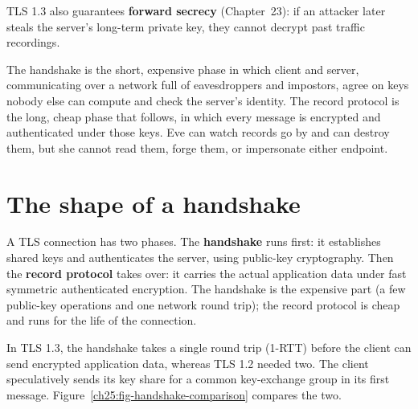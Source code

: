 TLS 1.3 also guarantees \textbf{forward secrecy} (Chapter~23): if an attacker
later steals the server's long-term private key, they cannot decrypt past
traffic recordings.

\begin{intuitionbox}
The handshake is the short, expensive phase in which client and server,
communicating over a network full of eavesdroppers and impostors, agree on keys
nobody else can compute and check the server's identity. The record protocol is
the long, cheap phase that follows, in which every message is encrypted and
authenticated under those keys. Eve can watch records go by and can destroy
them, but she cannot read them, forge them, or impersonate either endpoint.
\end{intuitionbox}

\section{The shape of a handshake}

A TLS connection has two phases. The \textbf{handshake} runs first: it
establishes shared keys and authenticates the server, using public-key
cryptography. Then the \textbf{record protocol} takes over: it carries the actual
application data under fast symmetric authenticated encryption. The handshake is
the expensive part (a few public-key operations and one network round trip); the
record protocol is cheap and runs for the life of the connection.

In TLS 1.3, the handshake takes a single round trip (1-RTT) before the client
can send encrypted application data, whereas TLS 1.2 needed two. The client
speculatively sends its key share for a common key-exchange group in its first
message. Figure~\ref{ch25:fig-handshake-comparison} compares the two.

